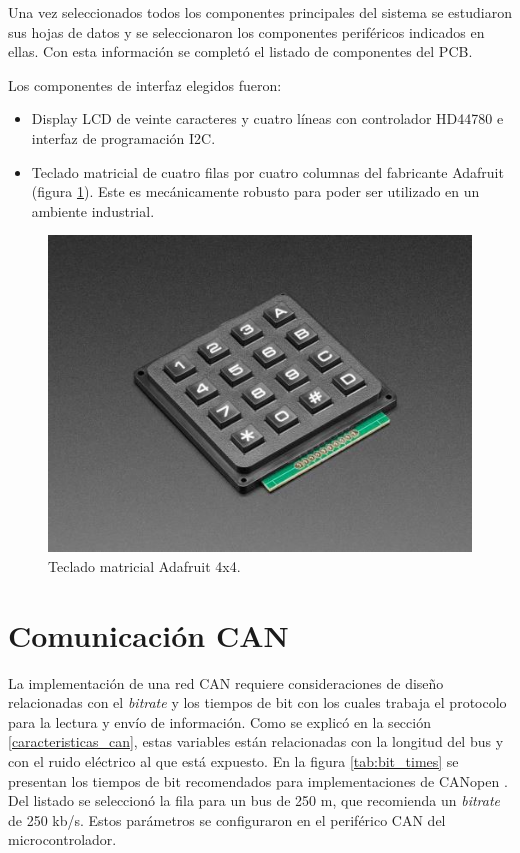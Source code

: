 Una vez seleccionados todos los componentes principales del sistema se estudiaron sus hojas de datos y se seleccionaron los componentes periféricos indicados en ellas. Con esta información se completó el listado de componentes del PCB.

Los componentes de interfaz elegidos fueron:
\begin{itemize}
	\item Display LCD de veinte caracteres y cuatro líneas con controlador HD44780 e interfaz de programación I2C. 
	\item Teclado matricial de cuatro filas por cuatro columnas del fabricante Adafruit \citep{web_adafruit} (figura \ref{fig:keypad}). Este es mecánicamente robusto para poder ser utilizado en un ambiente industrial. 
\end{itemize}

\begin{figure}[htbp]
	\centering
	\includegraphics[scale=.8]{./Figures/keypad.JPG}
	\caption{Teclado matricial Adafruit 4x4.}
	\label{fig:keypad}
\end{figure}



\section{Comunicación CAN}
\label{comunicacion_can}

La implementación de una red CAN requiere consideraciones de diseño relacionadas con el \textit{bitrate} y los tiempos de bit con los cuales trabaja el protocolo para la lectura y envío de información. Como se explicó en la sección \ref{caracteristicas_can}, estas variables están relacionadas con la longitud del bus y con el ruido eléctrico al que está expuesto. En la figura \ref{tab:bit_times} se presentan los tiempos de bit recomendados para implementaciones de CANopen \citep{UnderstandingCAN}. Del listado se seleccionó la fila para un bus de 250 m, que recomienda un \textit{bitrate} de 250 kb/s. Estos parámetros se configuraron en el periférico CAN del microcontrolador.


